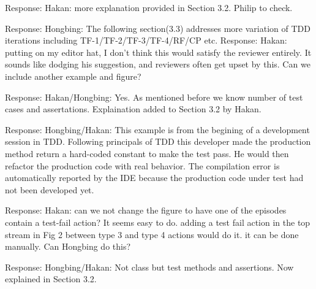 \documentclass[11pt]{article}
\begin{document}

\noindent Response: Hakan: more explanation provided in Section 3.2. Philip to check. 


\noindent Response: Hongbing: The following section(3.3) addresses more variation of TDD iterations including TF-1/TF-2/TF-3/TF-4/RF/CP etc. 
\noindent Response: Hakan: putting on my editor hat, I don't think this would satisfy the reviewer entirely. It sounds like dodging his suggestion, and reviewers often get upset by this. Can we include another example and figure?


\noindent Response: Hakan/Hongbing: Yes. As mentioned before we know number of test cases and assertations. Explaination added to Section 3.2 by Hakan.


\noindent Response: Hongbing/Hakan: This example is from the begining of a development session in TDD. Following principals of TDD this developer made the production method return a hard-coded constant to make the test pass. He would then refactor the production code with real behavior. The compilation error is automatically reported by the IDE because the production code under test had not been developed yet.

\noindent Response: Hakan: can we not change the figure to have one of the episodes contain a test-fail action? It seems easy to do. adding a test fail action in the top stream in Fig 2 between type 3 and type 4 actions would do it. it can be done manually. Can Hongbing do this?



\noindent Response: Hongbing/Hakan: Not class but test methods and assertions. Now explained in Section 3.2. 
\end{document}
